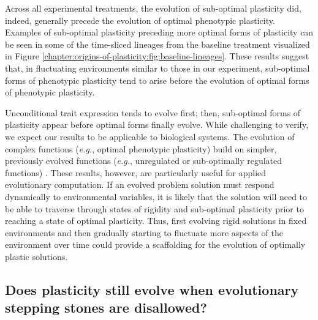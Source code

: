 Across all experimental treatments, the evolution of sub-optimal plasticity did, indeed, generally precede the evolution of optimal phenotypic plasticity.
Examples of sub-optimal plasticity preceding more optimal forms of plasticity can be seen in some of the time-sliced lineages from the baseline treatment visualized in Figure \ref{chapter:origins-of-plasticity:fig:baseline-lineages}. 
These results suggest that, in fluctuating environments similar to those in our experiment, sub-optimal forms of phenotypic plasticity tend to arise before the evolution of optimal forms of phenotypic plasticity. 

Unconditional trait expression tends to evolve first; then, sub-optimal forms of plasticity appear before optimal forms finally evolve.
While challenging to verify, we expect our results to be applicable to biological systems. 
The evolution of complex functions (\textit{e.g.}, optimal phenotypic plasticity) build on simpler, previously evolved functions (\textit{e.g.}, unregulated or sub-optimally regulated functions) \citep{lenski_evolutionary_2003}. 
These results, however, are particularly useful for applied evolutionary computation. 
If an evolved problem solution must respond dynamically to environmental variables, it is likely that the solution will need to be able to traverse through states of rigidity and sub-optimal plasticity prior to reaching a state of optimal plasticity. 
Thus, first evolving rigid solutions in fixed environments and then gradually starting to fluctuate more aspects of the environment over time could provide a scaffolding for the evolution of optimally plastic solutions.  

\subsection{Does plasticity still evolve when evolutionary stepping stones are disallowed?}

